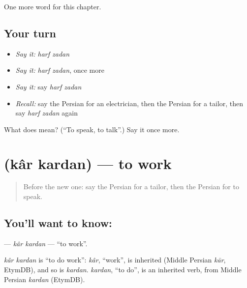 \begin{grammarlens}[title={What you've built}]
One more word for this chapter.
\end{grammarlens}

\subsection*{Your turn}
\begin{itemize}
\raggedright
  \item \emph{Say it:} \emph{harf zadan}
  \item \emph{Say it:} \emph{harf zadan}, once more
  \item \emph{Say it:} say \emph{harf zadan}
  \item \emph{Recall:} say the Persian for an electrician, then the Persian for a tailor, then say \emph{harf zadan} again
\end{itemize}

\begin{tcolorbox}[breakable,colback=teal!4,colframe=teal!35!black,title={Before you move on}]
What does   mean? (\textquotedblleft{}To speak, to talk\textquotedblright{}.) Say it once more.
\end{tcolorbox}
\section[\texorpdfstring{\fa{کار} \fa{کردن} (kâr kardan)}{کار کردن (kâr kardan)}]{  (kâr kardan) — to work}

\label{lesson:FA-C217-kar-kardan}



\begin{quote}
Before the new one: say the Persian for a tailor, then the Persian for to speak.
\end{quote}

\subsection*{You'll want to know:  }
\textbf{ } — \emph{kâr kardan} — \textquotedblleft{}to work\textquotedblright{}.

\begin{cousinweb}
\emph{kâr kardan} is \textquotedblleft{}to do work\textquotedblright{}: \emph{kâr}, \textquotedblleft{}work\textquotedblright{}, is inherited (Middle Persian \emph{kār}, EtymDB), and so is \emph{kardan}. \emph{kardan}, \textquotedblleft{}to do\textquotedblright{}, is an inherited verb, from Middle Persian \emph{kardan} (EtymDB).
\end{cousinweb}

